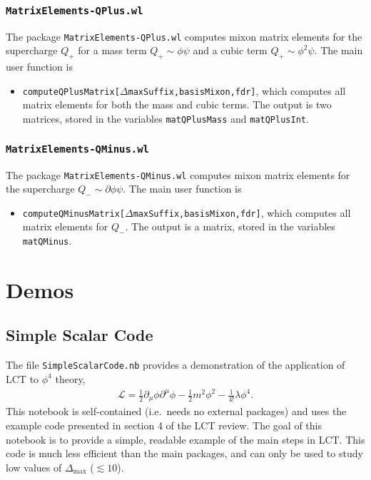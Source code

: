 \documentclass[12pt]{article}
\def\half{\frac{1}{2}}
\newcommand{\be}{\begin{eqnarray}}
\newcommand{\ee}{\end{eqnarray}}
\newcommand{\Lcal}{{\mathcal L}}
\newcommand\De\Delta
\newcommand{\p}{\partial}
\newcommand{\fr}{\frac}
\newcommand{\Dmax}{\De_{\max}}
\begin{document}
\subsubsection*{{\tt MatrixElements-QPlus.wl}}

The package {\tt MatrixElements-QPlus.wl} computes mixon matrix elements for the supercharge $Q_+$ for a mass term $Q_+ \sim \phi \psi$ and a cubic term $Q_+ \sim \phi^2 \psi$.   The main user function is
\begin{itemize}
\item {\tt computeQPlusMatrix[$\De$maxSuffix,basisMixon,fdr]}, which computes all matrix elements for both the mass and cubic terms. The output is two matrices,  stored in the variables {\tt matQPlusMass} and {\tt matQPlusInt}.
\end{itemize}

\subsubsection*{{\tt MatrixElements-QMinus.wl}}

The package {\tt MatrixElements-QMinus.wl} computes mixon matrix elements for the supercharge $Q_- \sim \p \phi \psi$.   The main user function is
\begin{itemize}
\item {\tt computeQMinusMatrix[$\De$maxSuffix,basisMixon,fdr]}, which computes all matrix elements for $Q_-$. The output is a matrix,  stored in the variables {\tt matQMinus}.
\end{itemize}



\section{Demos}
\label{sec:demos}

\subsection{Simple Scalar Code}

The file {\tt SimpleScalarCode.nb} provides a demonstration of the application of LCT to $\phi^4$ theory,
\be
\Lcal = \half \p_\mu\phi\p^\mu\phi - \half m^2 \phi^2 - \fr{1}{4!} \lambda \phi^4.
\ee
This notebook is self-contained (i.e.~needs no external packages) and uses the example code presented in section 4 of the LCT review. The goal of this notebook is to provide a simple, readable example of the main steps in LCT. This code is much less efficient than the main packages, and can only be used to study low values of $\Dmax$ ($\lesssim 10$).
\end{document}
